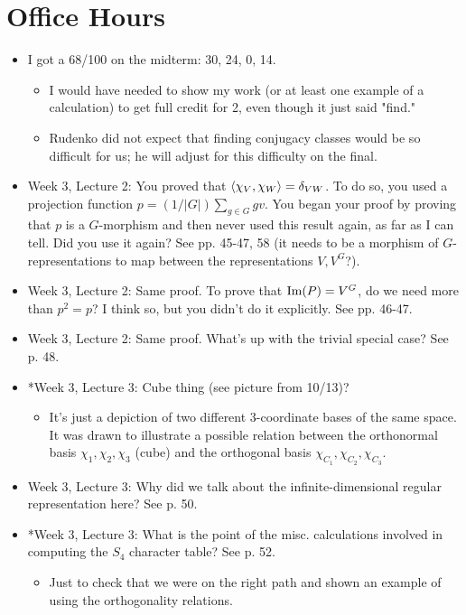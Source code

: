 \documentclass[../notes.tex]{subfiles}
\begin{document}
\section{Office Hours}\label{sse:OH9}
\begin{itemize}
    \item I got a 68/100 on the midterm: 30, 24, 0, 14.
    \begin{itemize}
        \item I would have needed to show my work (or at least one example of a calculation) to get full credit for 2, even though it just said "find."
        \item Rudenko did not expect that finding conjugacy classes would be so difficult for us; he will adjust for this difficulty on the final.
    \end{itemize}
    \item Week 3, Lecture 2: You proved that $\left\langle{\chi_V,\chi_W}\right\rangle=\delta_{VW}$. To do so, you used a projection function $p=(1/|G|)\sum_{g\in G}gv$. You began your proof by proving that $p$ is a $G$-morphism and then never used this result again, as far as I can tell. Did you use it again? See pp. 45-47, 58 (it needs to be a morphism of $G$-representations to map between the representations $V,V^G$?).
    \item Week 3, Lecture 2: Same proof. To prove that $\operatorname{Im}(P)=V^G$, do we need more than $p^2=p$? I think so, but you didn't do it explicitly. See pp. 46-47.
    \item Week 3, Lecture 2: Same proof. What's up with the trivial special case? See p. 48.
    \item *Week 3, Lecture 3: Cube thing (see picture from 10/13)?
    \begin{itemize}
        \item It's just a depiction of two different 3-coordinate bases of the same space. It was drawn to illustrate a possible relation between the orthonormal basis $\chi_1,\chi_2,\chi_3$ (cube) and the orthogonal basis $\chi_{C_1},\chi_{C_2},\chi_{C_3}$.
    \end{itemize}
    \item Week 3, Lecture 3: Why did we talk about the infinite-dimensional regular representation here? See p. 50.
    \item *Week 3, Lecture 3: What is the point of the misc. calculations involved in computing the $S_4$ character table? See p. 52.
    \begin{itemize}
        \item Just to check that we were on the right path and shown an example of using the orthogonality relations.

\end{itemize}
\end{itemize}
\end{document}
